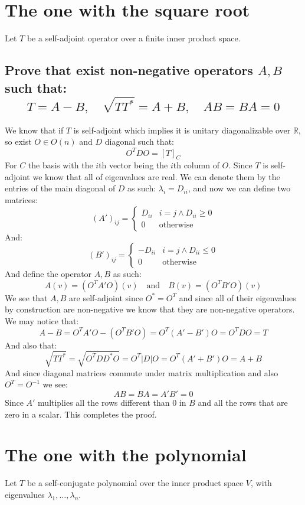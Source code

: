 \documentclass[11pt,a4paper]{article}
\theoremstyle{plain}
\newcommand{\R}{\mathbb{R}}
\begin{document}
	\newpage
	
	\section{The one with the square root}
	Let $T$ be a self-adjoint operator over a finite inner product space.
	\subsection{Prove that exist non-negative operators $A,B$ such that:
	\[
		T = A-B,\quad \sqrt{TT^{*}}=A+B,\quad AB=BA=0
	\]}
	We know that if $T$ is self-adjoint which implies it is unitary 
	diagonalizable over $\R$, so exist $O\in O(n)$ and $D$ diagonal such that:
	\[
		O^{T}DO = [T]_C
	\]
	For $C$ the basis with the $i$th vector being the $i$th column of $O$.
	Since $T$ is self-adjoint we know that all of eigenvalues are real.
	We can denote them by the entries of the main diagonal of $D$ as such:
	$\lambda_i = D_{ii}$, and now we can define two matrices:
	\[
		(A')_{ij} = 
		\begin{cases}
			D_{ii} & i=j \land D_{ii} \geq 0 \\
			0 & \text{otherwise}
		\end{cases}
	\]
	And:
	\[
		(B')_{ij} = 
		\begin{cases}
			-D_{ii} & i=j \land D_{ii} \leq 0 \\
			0 & \text{otherwise}
		\end{cases}
	\]
	And define the operator $A,B$ as such:
	\[
		A(v) = (O^{T} A' O)(v) \quad\text{and}\quad B(v) = (O^{T} B' O)(v)
	\]
	We see that $A,B$ are self-adjoint since $O^* = O^{T}$ and since all of
	their eigenvalues by construction are non-negative we know that they are
	non-negative operators. We may notice that:
	\[
		A - B = O^{T} A' O - (O^{T} B' O) = O^{T} (A'-B') O = O^{T} D O = T
	\]
	And also that:
	\[
		\sqrt{TT^*} = \sqrt{O^{T} DD^* O} = O^{T} |D| O = O^{T} (A'+B') O = 
		A+B
	\]
	And since diagonal matrices commute under matrix multiplication and also
	$O^{T} = O^{-1}$ we see:
	\[
		AB = BA = A'B' = 0
	\]
	Since $A'$ multiplies all the rows different than $0$ in $B$ and all the rows
	that are zero in a scalar. This completes the proof.
	
	\newpage
	\section{The one with the polynomial}
	Let $T$ be a self-conjugate polynomial over the inner product space $V$, 
	with eigenvalues $\lambda_1,\dots,\lambda_n$.
\end{document}

